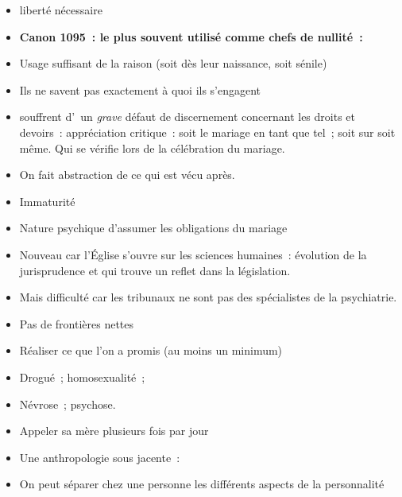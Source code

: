 \begin{itemize}
\item
  liberté nécessaire
\item
  \textbf{Canon 1095~: le plus souvent utilisé comme chefs de nullité~:}
\item
   
  Usage suffisant de la raison (soit dès leur naissance, soit sénile)
   
\item
   
  Ils ne savent pas exactement à quoi ils s'engagent
   
\item
   
  souffrent d'~un \emph{grave} défaut de discernement concernant les
  droits et devoirs~: appréciation critique~: soit le mariage en tant
  que tel~; soit sur soit même. Qui se vérifie lors de la célébration du
  mariage.
   
\item
   
  On fait abstraction de ce qui est vécu après.
   
\item
   
  Immaturité
   
\item
   
  Nature psychique d'assumer les obligations du mariage
   
\item
   
  Nouveau car l'Église s'ouvre sur les sciences humaines~: évolution de
  la jurisprudence et qui trouve un reflet dans la législation.
   
\item
   
  Mais difficulté car les tribunaux ne sont pas des spécialistes de la
  psychiatrie.
   
\item
   
  Pas de frontières nettes
   
\item
   
  Réaliser ce que l'on a promis (au moins un minimum)
   
\item
   
  Drogué~; homosexualité~;
   
\item
   
  Névrose~; psychose.
   
\item
   
  Appeler sa mère plusieurs fois par jour
   
\item
  Une anthropologie sous jacente~:
\item
   
  On peut séparer chez une personne les différents aspects de la
  personnalité
   
\end{itemize}

